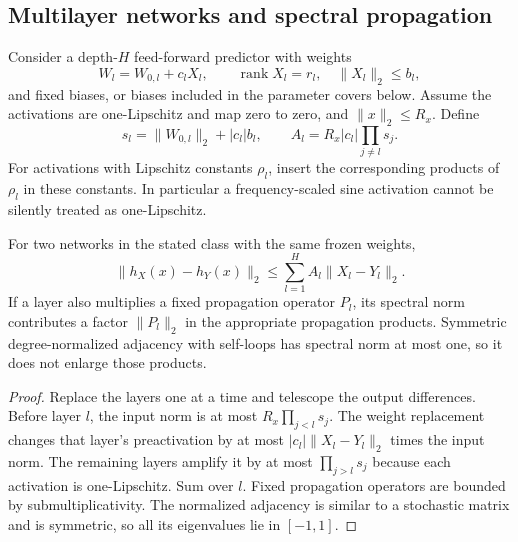 \subsection{Multilayer networks and spectral propagation}
Consider a depth-$H$ feed-forward predictor with weights
\begin{equation}
 W_l=W_{0,l}+c_lX_l,\qquad\operatorname{rank}X_l=r_l,
 \quad\|X_l\|_2\leq b_l,
\end{equation}
and fixed biases, or biases included in the parameter covers below.
Assume the activations are one-Lipschitz and map zero to zero, and
$\|x\|_2\leq R_x$. Define
\begin{equation}
 s_l=\|W_{0,l}\|_2+|c_l|b_l,
 \qquad A_l=R_x|c_l|\prod_{j\ne l}s_j.
 \label{eq:network-spectral-constants}
\end{equation}
For activations with Lipschitz constants $\rho_l$, insert the corresponding
products of $\rho_l$ in these constants. In particular a frequency-scaled
sine activation cannot be silently treated as one-Lipschitz.

\begin{lemma}
\label{lem:network-sensitivity}
For two networks in the stated class with the same frozen weights,
\begin{equation}
 \|h_X(x)-h_Y(x)\|_2
       \leq\sum_{l=1}^H A_l\|X_l-Y_l\|_2.
 \label{eq:network-telescope}
\end{equation}
If a layer also multiplies a fixed propagation operator $P_l$, its spectral
norm contributes a factor $\|P_l\|_2$ in the appropriate propagation
products. Symmetric degree-normalized adjacency with self-loops has
spectral norm at most one, so it does not enlarge those products.
\end{lemma}
\begin{proof}
Replace the layers one at a time and telescope the output differences.
Before layer $l$, the input norm is at most
$R_x\prod_{j<l}s_j$. The weight replacement changes that layer's
preactivation by at most $|c_l|\|X_l-Y_l\|_2$ times the input norm.
The remaining layers amplify it by at most $\prod_{j>l}s_j$ because
each activation is one-Lipschitz. Sum over $l$. Fixed propagation
operators are bounded by submultiplicativity. The normalized adjacency
is similar to a stochastic matrix and is symmetric, so all its
eigenvalues lie in $[-1,1]$.
\end{proof}


